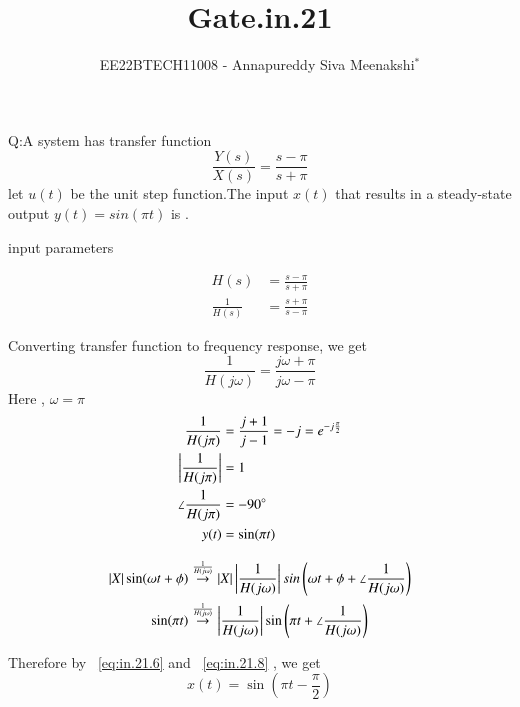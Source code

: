\documentclass[journal,12pt,twocolumn]{IEEEtran}
\newcommand{\system}[1]{\stackrel{#1}{\rightarrow}}
\theoremstyle{remark}
\begin{document}

\vspace{3cm}

\title{Gate.in.21}
\author{EE22BTECH11008 - Annapureddy Siva Meenakshi$^{*}$%
}
\maketitle
\bigskip

\renewcommand{\thefigure}{\theenumi}
\renewcommand{\thetable}{\theenumi}
Q:A system has transfer function
 \[\frac{Y(s)}{X(s)}=\frac {s-\pi}{s+\pi}\]
 let $u(t)$ be the unit step function.The input $x(t)$ that results in a steady-state output $y(t)=sin(\pi t)$ is \underline{\quad}.
\solution

\begin{table}[!ht]
    \centering
        
    \caption{input parameters}
    \label{tab:in_21_t1}
\end{table}

\begin{align}
    H(s) &= \frac{s - \pi}{s + \pi} \\
    \frac{1}{H(s)} &= \frac{s + \pi}{s - \pi}
\end{align}

 Converting transfer function to frequency response, we get
 \begin{equation}
     \frac{1}{H(j\omega)}=\frac{j\omega+\pi}{j\omega-\pi}
 \end{equation}
 Here , $\omega=\pi$
 \begin{align}
   \frac{1}{H(j\pi)} &= \frac{j + 1}{j - 1} = -j = e^{-j\frac{\pi}{2}} \\
    \left\vert\frac{1}{H(j\pi)}\right\vert &= 1 \\
    \angle{\frac{1}{H(j\pi)} }&= -90^\circ \\
    y(t) &= \sin(\pi t) \label{eq:in.21.6}
\end{align}

\begin{align}
  \abs{X}\sin(\omega t+\phi)&\system{\frac{1}{H(j\omega)}}\abs{X}\abs{\frac{1}{H(j\omega)}}sin\left(\omega t +\phi +\angle{\frac{1}{H(j\omega)} }\right)\label{eq:in.21.7}\\
  \sin(\pi t)&\system{\frac{1}{H(j\omega)}}\abs{\frac{1}{H(j\omega)}}\sin\left(\pi t  +\angle{\frac{1}{H(j\omega)} }\right)\label{eq:in.21.8}
\end{align}

Therefore by ~\eqref{eq:in.21.6} and ~\eqref{eq:in.21.8} , we get
\begin{equation}
    x(t)=\sin\left(\pi t -\frac{\pi}{2}\right)
\end{equation}
\end{document}
